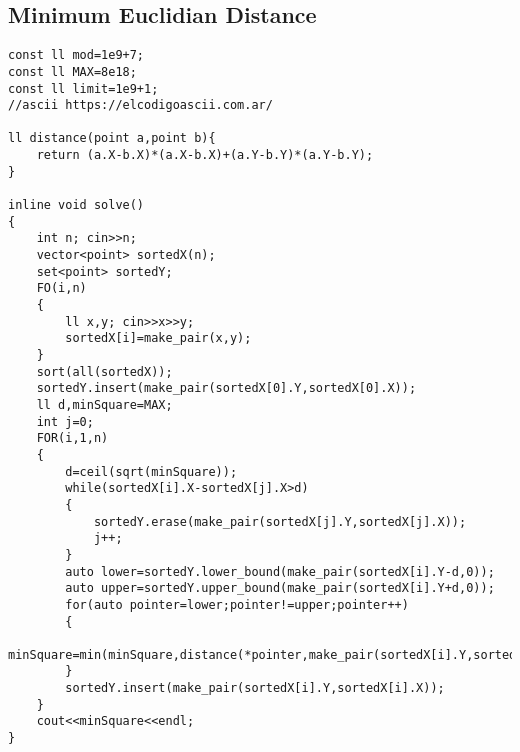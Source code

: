 \documentclass{article}
\begin{document}
\subsection{Minimum Euclidian Distance}
\begin{lstlisting}
const ll mod=1e9+7;
const ll MAX=8e18;
const ll limit=1e9+1;
//ascii https://elcodigoascii.com.ar/

ll distance(point a,point b){
    return (a.X-b.X)*(a.X-b.X)+(a.Y-b.Y)*(a.Y-b.Y);
}

inline void solve()
{
    int n; cin>>n;
    vector<point> sortedX(n);
    set<point> sortedY;
    FO(i,n)
    {
        ll x,y; cin>>x>>y;
        sortedX[i]=make_pair(x,y);
    }
    sort(all(sortedX));
    sortedY.insert(make_pair(sortedX[0].Y,sortedX[0].X));
    ll d,minSquare=MAX;
    int j=0;
    FOR(i,1,n)
    {
        d=ceil(sqrt(minSquare));
        while(sortedX[i].X-sortedX[j].X>d)
        {
            sortedY.erase(make_pair(sortedX[j].Y,sortedX[j].X));
            j++;
        }
        auto lower=sortedY.lower_bound(make_pair(sortedX[i].Y-d,0));
        auto upper=sortedY.upper_bound(make_pair(sortedX[i].Y+d,0));
        for(auto pointer=lower;pointer!=upper;pointer++)
        {
            minSquare=min(minSquare,distance(*pointer,make_pair(sortedX[i].Y,sortedX[i].X)));
        }
        sortedY.insert(make_pair(sortedX[i].Y,sortedX[i].X));
    }
    cout<<minSquare<<endl;
}

\end{lstlisting}
\end{document}
